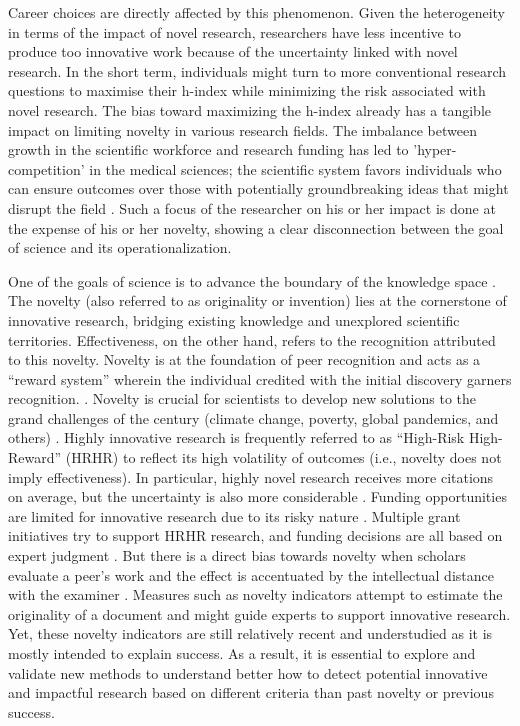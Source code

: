 Career choices are directly affected by this phenomenon. Given the heterogeneity in terms of the impact of novel research, researchers have less incentive to produce too innovative work because of the uncertainty linked with novel research. In the short term, individuals might turn to more conventional research questions to maximise their h-index while minimizing the risk associated with novel research.%
The bias toward maximizing the h-index already has a tangible impact on limiting novelty in various research fields. The imbalance between growth in the scientific workforce and research funding has led to 'hyper-competition' in the medical sciences; the scientific system favors individuals who can ensure outcomes over those with potentially groundbreaking ideas that might disrupt the field \citep{alberts2014rescuing}. Such a focus of the researcher on his or her impact is done at the expense of his or her novelty, showing a clear disconnection between the goal of science and its operationalization.

One of the goals of science is to advance the boundary of the knowledge space \citep{shi2015weaving,witt2016propositions,veugelers2019scientific}. The novelty (also referred to as originality or invention) lies at the cornerstone of innovative research, bridging existing knowledge and unexplored scientific territories. Effectiveness, on the other hand, refers to the recognition attributed to this novelty. Novelty is at the foundation of peer recognition and acts as a ``reward system'' wherein the individual credited with the initial discovery garners recognition. \citep{merton1957priorities,stephan1996economics,carayol2019}. Novelty is crucial for scientists to develop new solutions to the grand challenges of the century (climate change, poverty, global pandemics, and others) \citep{petersen2021grand}. Highly innovative research is frequently referred to as ``High-Risk High-Reward'' (HRHR) to reflect its high volatility of outcomes (i.e., novelty does not imply effectiveness). In particular, highly novel research receives more citations on average, but the uncertainty is also more considerable \citep{wang2017bias}. %
Funding opportunities are limited for innovative research due to its risky nature \citep{ayoubi2021does,ocde,franzoni2022funding}. 
Multiple grant initiatives try to support HRHR research, and funding decisions are all based on expert judgment \citep{ocde}. %
But there is a direct bias towards novelty when scholars evaluate a peer's work \citep{wang2017bias,ayoubi2021does} and the effect is accentuated by the intellectual distance with the examiner \citep{boudreau2016looking}. Measures such as novelty indicators attempt to estimate the originality of a document and might guide experts to support innovative research. %
Yet, these novelty indicators are still relatively recent and understudied as it is mostly intended to explain success. As a result, it is essential to explore and validate new methods to understand better how to detect potential innovative and impactful research based on different criteria than past novelty or previous success.



